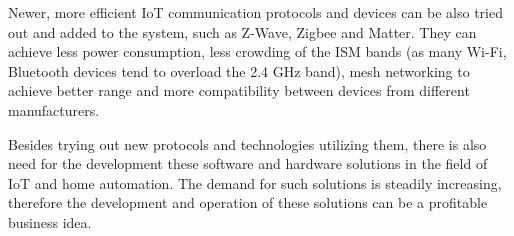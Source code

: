 Newer, more efficient IoT communication protocols and devices can be also tried out and added to the system, such as Z-Wave, Zigbee and Matter. They can achieve less power consumption, less crowding of the ISM bands (as many Wi-Fi, Bluetooth devices tend to overload the 2.4 GHz band), mesh networking to achieve better range and more compatibility between devices from different manufacturers.

Besides trying out new protocols and technologies utilizing them, there is also need for the development these software and hardware solutions in the field of IoT and home automation. The demand for such solutions is steadily increasing, therefore the development and operation of these solutions can be a profitable business idea.
